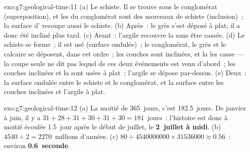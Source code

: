 \begin{solution}{exo:g7:geological-time:11}
(a) Le schiste. Il se trouve sous le conglomérat (superposition), et les
 du conglomérat sont des morceaux de schiste (inclusion)~; la
surface d' recoupe aussi le schiste. (b) Après~: le grès s'est
déposé à plat, il a donc été incliné plus tard. (c) Avant~: l'argile
recouvre la  sans être cassée. (d) Le schiste se forme~; il est usé
(surface ondulée)~; le conglomérat, le grès et le calcaire se déposent,
dans cet ordre~; les couches sont inclinées, et la  les casse ---
la coupe seule ne dit pas lequel de ces deux événements est venu
d'abord~; les couches inclinées et la  sont usées à plat~; l'argile
se dépose par-dessus. (e) Deux~: la surface ondulée entre le schiste et le
conglomérat, et la surface entre les couches inclinées et l'argile à plat.
\end{solution}

\begin{solution}{exo:g7:geological-time:12}
(a) La moitié de 365~jours, c'est 182.5~jours. De janvier à juin, il y a
$31+28+31+30+31+30 = 181$~jours~: l'histoire est donc à moitié écoulée
1.5~jour après le début de juillet, le \textbf{2~juillet à midi}. (b)
$4540 \div 2 = 2270$~millions d'années. (c) $80 \div \num{4540000000} \times \num{31536000} \approx 0.56$~:
environ \textbf{0.6~seconde}.
\end{solution}

